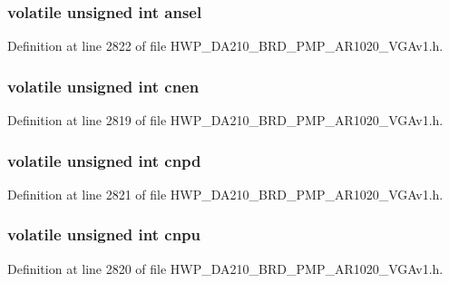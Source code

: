 \subsubsection[{ansel}]{\setlength{\rightskip}{0pt plus 5cm}volatile unsigned int ansel}\label{struct_port_reg_map_a6ffbe66f450395aca9edc436fe0a648a}


Definition at line 2822 of file H\+W\+P\+\_\+\+D\+A210\+\_\+\+B\+R\+D\+\_\+P\+M\+P\+\_\+\+A\+R1020\+\_\+\+V\+G\+Av1.\+h.

\hypertarget{struct_port_reg_map_a461d0294739e53f116e82674e86a57b1}{}
\subsubsection[{cnen}]{\setlength{\rightskip}{0pt plus 5cm}volatile unsigned int cnen}\label{struct_port_reg_map_a461d0294739e53f116e82674e86a57b1}


Definition at line 2819 of file H\+W\+P\+\_\+\+D\+A210\+\_\+\+B\+R\+D\+\_\+P\+M\+P\+\_\+\+A\+R1020\+\_\+\+V\+G\+Av1.\+h.

\hypertarget{struct_port_reg_map_a101731c123625514d21f64228c367464}{}
\subsubsection[{cnpd}]{\setlength{\rightskip}{0pt plus 5cm}volatile unsigned int cnpd}\label{struct_port_reg_map_a101731c123625514d21f64228c367464}


Definition at line 2821 of file H\+W\+P\+\_\+\+D\+A210\+\_\+\+B\+R\+D\+\_\+P\+M\+P\+\_\+\+A\+R1020\+\_\+\+V\+G\+Av1.\+h.

\hypertarget{struct_port_reg_map_a95b951e4fb84df98902e1f9c3bdcdeac}{}
\subsubsection[{cnpu}]{\setlength{\rightskip}{0pt plus 5cm}volatile unsigned int cnpu}\label{struct_port_reg_map_a95b951e4fb84df98902e1f9c3bdcdeac}


Definition at line 2820 of file H\+W\+P\+\_\+\+D\+A210\+\_\+\+B\+R\+D\+\_\+P\+M\+P\+\_\+\+A\+R1020\+\_\+\+V\+G\+Av1.\+h.

\hypertarget{struct_port_reg_map_a695d2ece0857aa46158d751c92a448f8}{}
